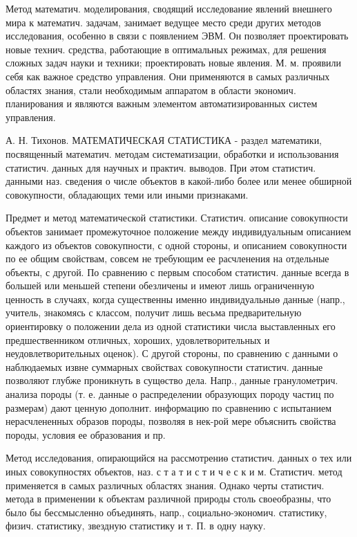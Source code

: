 \documentclass[10pt]{article}
\begin{document}
Метод математич. моделирования, сводящий исследование явлений внешнего мира к математич. задачам, занимает ведущее место среди других методов исследования, особенно в связи с появлением ЭВМ. Он позволяет проектировать новые технич. средства, работающие в оптимальных режимах, для решения сложных задач науки и техники; проектировать новые явления. М. м. проявили себя как важное средство управления. Они применяются в самых различных областях знания, стали необходимым аппаратом в области экономич. планирования и являются важным элементом автоматизированных систем управления.



А. Н. Тихонов. МАТЕМАТИЧЕСКАЯ СТАТИСТИКА - раздел математики, посвященный математич. методам систематизации, обработки и использования статистич. данных для научных и практич. выводов. При әтом статистич. данными наз. сведения о числе объектов в какой-либо более или менее обширной совокупности, обладающих теми или иными признаками.



Предмет и метод математической статистики. Статистич. описание совокупности объектов занимает промежуточное положение между индивидуальным описанием каждого из объектов совокупности, с одной стороны, и описанием совокупности по ее общим свойствам, совсем не требующим ее расчленения на отдельные объекты, с другой. По сравнению с первым способом статистич. данные всегда в большей или меньшей степени обезличены и имеют лишь ограниченную ценность в случаях, когда существенны именно индивидуальныө данные (напр., учитель, знакомясь с классом, получит лишь весьма предварительную ориентировку о положении дела из одной статистики числа выставленных его предшественником отличных, хороших, удовлетворительных и неудовлетворительных оценок). С другой стороны, по сравнению с данными о наблюдаемых извне суммарных свойствах совокупности статистич. данные позволяют глубже проникнуть в сущөство дела. Напр., данные гранулометрич. анализа породы (т. е. данные о распределении образующих породу частиц по размерам) дают ценную дополнит. информацию по сравнению с испытанием нерасчлененных образов породы, позволяя в нек-рой мере объяснить свойства породы, условия ее образования и пр.



Метод исследования, опирающийся на рассмотрениө статистич. данных о тех или иных совокупностях объектов, наз. с т а т и с т и ч е с к и м. Статистич. метод применяется в самых различных областях знания. Однако черты статистич. метода в применении к объектам различной природы столь своеобразны, что было бы бессмысленно объединять, напр., социально-экономич. статистику, физич. статистику, звездную статистику и т. П. в одну науку.
\end{document}

